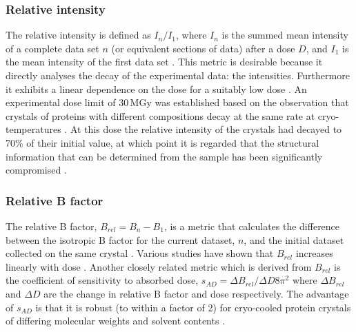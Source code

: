         \subsubsection{Relative intensity}
        \label{subs:Relative intensity}
            The relative intensity is defined as $I_n/I_1$, where $I_n$ is the summed mean intensity of a complete data set $n$ (or equivalent sections of data) after a dose $D$, and $I_1$ is the mean intensity of the first data set \cite{garman2010}.
            This metric is desirable because it directly analyses the decay of the experimental data: the intensities. Furthermore it exhibits a linear dependence on the dose for a suitably low dose \cite{owen2006,zeldin2013dwd}.
            An experimental dose limit of 30\,MGy was established based on the observation that crystals of proteins with different compositions decay at the same rate at cryo-temperatures \cite{owen2006}.
            At this dose the relative intensity of the crystals had decayed to 70\% of their initial value, at which point it is regarded that the structural information that can be determined from the sample has been significantly compromised \cite{owen2006,blundell1976protein}.

        \subsubsection{Relative B factor}
        \label{subs:Relative B factor}
            The relative B factor, $B_{rel} = B_n - B_1$, is a metric that calculates the difference between the isotropic B factor for the current dataset, $n$, and the initial dataset collected on the same crystal \cite{kmetko2006}.
            Various studies have shown that $B_{rel}$ increases linearly with dose \cite{kmetko2006,borek2007many,bourenkov2010optimization,leal2012}.
            Another closely related metric which is derived from $B_{rel}$ is the coefficient of sensitivity to absorbed dose, $s_{AD} = \Delta B_{rel} / \Delta D 8\pi^2$ where $\Delta B_{rel}$ and $\Delta D$ are the change in relative B factor and dose respectively.
            The advantage of $s_{AD}$ is that it is robust (to within a factor of 2) for cryo-cooled protein crystals of differing molecular weights and solvent contents \cite{kmetko2006}.

